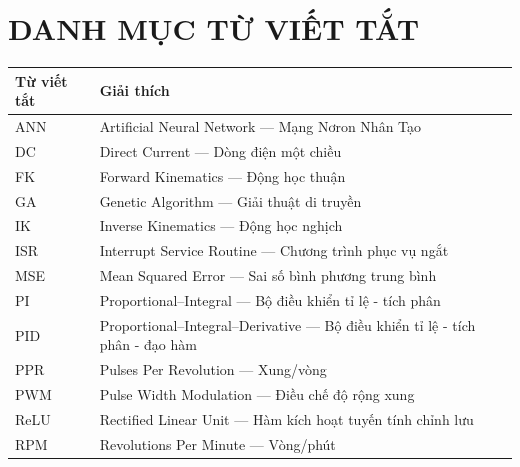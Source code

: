 
\chapter*{DANH MỤC TỪ VIẾT TẮT}

\begin{table}[h]
\renewcommand{\arraystretch}{1.4}
\begin{tabular}{@{} p{3.5cm} p{11cm} @{}}
\textbf{Từ viết tắt} & \textbf{Giải thích} \\
\hline
ANN     & Artificial Neural Network — Mạng Nơron Nhân Tạo \\
DC      & Direct Current — Dòng điện một chiều \\
FK      & Forward Kinematics — Động học thuận \\
GA      & Genetic Algorithm — Giải thuật di truyền \\
IK      & Inverse Kinematics — Động học nghịch \\
ISR     & Interrupt Service Routine — Chương trình phục vụ ngắt \\
MSE     & Mean Squared Error — Sai số bình phương trung bình \\
PI      & Proportional–Integral — Bộ điều khiển tỉ lệ - tích phân \\
PID     & Proportional–Integral–Derivative — Bộ điều khiển tỉ lệ - tích phân - đạo hàm \\
PPR     & Pulses Per Revolution — Xung/vòng \\
PWM     & Pulse Width Modulation — Điều chế độ rộng xung \\
ReLU    & Rectified Linear Unit — Hàm kích hoạt tuyến tính chỉnh lưu \\
RPM     & Revolutions Per Minute — Vòng/phút \\
\end{tabular}
\end{table}
